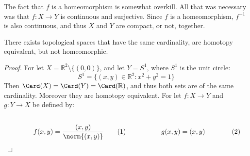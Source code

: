 \documentclass[crop=false,class=book,oneside]{standalone}
\begin{document}
            The fact that $f$ is a homeomorphism is somewhat overkill.
            All that was necessary was that $f:X\rightarrow{Y}$
            is continuous and surjective.
            Since $f$ is a homeomorphism, $f^{-1}$ is also
            continuous, and thus $X$ and $Y$ are compact, or not, together.
            \begin{theorem}
                \label{theorem:surgery_theory_Homotopy_%
                       equivalance_of_plane_without_point_and_unit_%
                       disc_but_not_homeomorphic}
                There exists topological spaces that have the same
                cardinality, are homotopy equivalent, but not
                homeomorphic.
            \end{theorem}
            \begin{proof}
                For let $X=\mathbb{R}^{2}\setminus\{(0,0)\}$,
                and let $Y=S^{1}$, where $S^{1}$ is the unit circle:
                \begin{equation}
                    S^{1}=\{(x,y)\in\mathbb{R}^{2}:x^{2}+y^{2}=1\}
                \end{equation}
                Then $\Card(X)=\Card(Y)=\Card(\mathbb{R})$, and thus
                both sets are of the same cardinality. Moreover they
                are homotopy equivalent. For let $f:{X}\rightarrow{Y}$ and
                $g:{Y}\rightarrow{X}$ be defined by:
                \par
                \begin{subequations}
                    \begin{minipage}[b]{0.49\textwidth}
                        \centering
                        \begin{equation}
                            f(x,y)=\frac{(x,y)}{\norm{(x,y)}}
                        \end{equation}
                    \end{minipage}
                    \hfill
                    \begin{minipage}[b]{0.49\textwidth}
                        \centering
                        \begin{equation}
                            g(x,y)=(x,y)
                        \end{equation}
                    \end{minipage}
                \end{subequations}
                \par\hfill\par

\end{proof}
\end{document}
